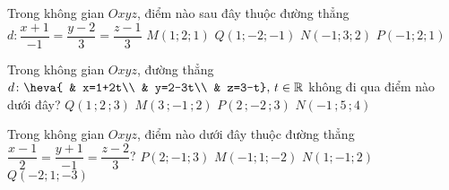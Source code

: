 \begin{ex}%
	Trong không gian $ Oxyz$, điểm nào sau đây thuộc đường thẳng $ d\colon\dfrac{x+1}{-1}=\dfrac{y-2}{3}=\dfrac{z-1}{3}$
	\choice
	{$M(1;2;1)$}
	{$Q(1;-2;-1)$}
	{$N(-1;3;2)$}
	{\True $P(-1;2;1)$}
\end{ex}

\begin{ex}%
	Trong không gian $ Oxyz$, đường thẳng $d\colon \heva{
		& x=1+2t\\ 
		& y=2-3t\\ 
		& z=3-t} , \, t\in\mathbb{R}$ không đi qua điểm nào dưới đây?
	\choice
	{$ Q\left(1\,;2\,;3\right)$}
	{$M\left(3\,;-1\,;2\right)$}
	{\True $ P\left(2\,;-2\,;3\right)$}
	{$ N\left(-1\,;5\,;4\right)$}
\end{ex}

\begin{ex}%
	Trong không gian $ Oxyz$, điểm nào dưới đây thuộc đường thẳng $\dfrac{x-1}{2}=\dfrac{y+1}{-1}=\dfrac{z-2}{3}$?
	\choice
	{$ P\left(2;-1;3\right)$}
	{$ M\left(-1;1;-2\right)$}
	{\True $ N\left(1;-1;2\right)$}
	{$ Q\left(-2;1;-3\right)$}
\end{ex}



